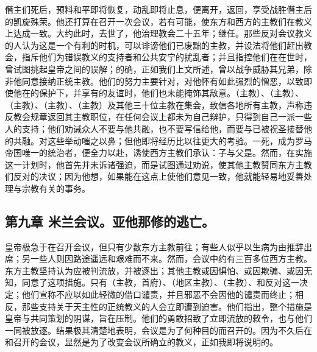 僭主们死后，预料和平即将恢复，动乱即将止息，便离开，返回，享受战胜僭主后的凯旋殊荣。他还打算在召开一次会议，若有可能，使东方和西方的主教们在教义上达成一致。大约此时，去世了，他治理教会二十五年；继任。那些反对会议教义的人认为这是一个有利的时机，可以诽谤他们已废黜的主教，并设法将他们赶出教会，指斥他们为错误教义的支持者和公共安宁的扰乱者；并且指控他们在在世时，曾试图挑起皇帝之间的误解；的确，正如我们上文所述，曾以战争威胁其兄弟，除非他同意接纳正统主教。他们的努力主要针对，对他怀有如此强烈的憎恶，以致即使他在的保护下，并享有的友谊时，他们也未能掩饰其敌意。（主教）、（主教）、（主教）、（主教）、（主教）及其他三十位主教在集会，致信各地所有主教，声称违反教会规章返回其主教职位，在任何会议上都未为自己辩护，只得到自己一派一些人的支持；他们劝诫众人不要与他共融，也不要写信给他，而要与已被祝圣接替他的共融。对这些举动嗤之以鼻；但他即将经历比以往更大的考验。一死，成为罗马帝国唯一的统治者，便全力以赴，诱使西方主教们承认：子与父是。然而，在实施这一计划时，他首先并未诉诸强迫，而是试图通过劝说，使其他主教赞同东方主教们反对的决议；因为他想，如果能在这点上使他们意见一致，他就能轻易地妥善处理与宗教有关的事务。\par


\subsection{第九章 米兰会议。亚他那修的逃亡。}

皇帝极急于在召开会议，但只有少数东方主教前往；有些人似乎以生病为由推辞出席；另一些人则因路途遥远和艰难而不来。然而，会议中约有三百多位西方主教。东方主教坚持认为应被判流放，并被逐出；其他主教或因惧怕、或因欺骗、或因无知，同意了这项措施。只有（主教，首府）、（地区主教）、（主教）、和反对这一决定；他们宣称不应以如此轻微的借口谴责，并且邪恶不会因他的谴责而终止；相反，那些支持关于天主性的正统教义的人会立即遭到迫害。他们指出，整个措施是皇帝与共同策划的阴谋，旨在压制。他们的勇敢招致了立即流放的敕令，也与他们一同被放逐。结果极其清楚地表明，会议是为了何种目的而召开的。因为不久后在和召开的会议，显然是为了改变会议所确立的教义，正如我即将说明的。\par

